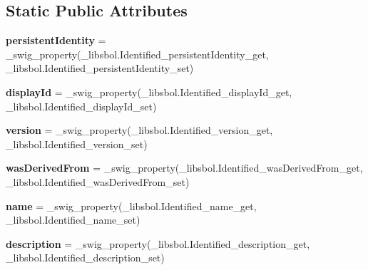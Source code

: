 \subsection*{Static Public Attributes}
\begin{DoxyCompactItemize}
\item 
{\bfseries persistent\+Identity} = \+\_\+swig\+\_\+property(\+\_\+libsbol.\+Identified\+\_\+persistent\+Identity\+\_\+get, \+\_\+libsbol.\+Identified\+\_\+persistent\+Identity\+\_\+set)\hypertarget{classsbol_1_1libsbol_1_1_identified_aba54d67c31675ac09eaf1501d8ef4dff}{}\label{classsbol_1_1libsbol_1_1_identified_aba54d67c31675ac09eaf1501d8ef4dff}

\item 
{\bfseries display\+Id} = \+\_\+swig\+\_\+property(\+\_\+libsbol.\+Identified\+\_\+display\+Id\+\_\+get, \+\_\+libsbol.\+Identified\+\_\+display\+Id\+\_\+set)\hypertarget{classsbol_1_1libsbol_1_1_identified_ac71297459486760294dd47f11fa394d3}{}\label{classsbol_1_1libsbol_1_1_identified_ac71297459486760294dd47f11fa394d3}

\item 
{\bfseries version} = \+\_\+swig\+\_\+property(\+\_\+libsbol.\+Identified\+\_\+version\+\_\+get, \+\_\+libsbol.\+Identified\+\_\+version\+\_\+set)\hypertarget{classsbol_1_1libsbol_1_1_identified_a3a2e7d3220478712d087e3000851021f}{}\label{classsbol_1_1libsbol_1_1_identified_a3a2e7d3220478712d087e3000851021f}

\item 
{\bfseries was\+Derived\+From} = \+\_\+swig\+\_\+property(\+\_\+libsbol.\+Identified\+\_\+was\+Derived\+From\+\_\+get, \+\_\+libsbol.\+Identified\+\_\+was\+Derived\+From\+\_\+set)\hypertarget{classsbol_1_1libsbol_1_1_identified_a11aeb7dbdbb811723b72be7a2accf3b4}{}\label{classsbol_1_1libsbol_1_1_identified_a11aeb7dbdbb811723b72be7a2accf3b4}

\item 
{\bfseries name} = \+\_\+swig\+\_\+property(\+\_\+libsbol.\+Identified\+\_\+name\+\_\+get, \+\_\+libsbol.\+Identified\+\_\+name\+\_\+set)\hypertarget{classsbol_1_1libsbol_1_1_identified_a133d7ce431453d6f70ae22676958d9f0}{}\label{classsbol_1_1libsbol_1_1_identified_a133d7ce431453d6f70ae22676958d9f0}

\item 
{\bfseries description} = \+\_\+swig\+\_\+property(\+\_\+libsbol.\+Identified\+\_\+description\+\_\+get, \+\_\+libsbol.\+Identified\+\_\+description\+\_\+set)\hypertarget{classsbol_1_1libsbol_1_1_identified_a8f8ef118afe7f8b1b5c6a567df514368}{}\label{classsbol_1_1libsbol_1_1_identified_a8f8ef118afe7f8b1b5c6a567df514368}

\end{DoxyCompactItemize}


